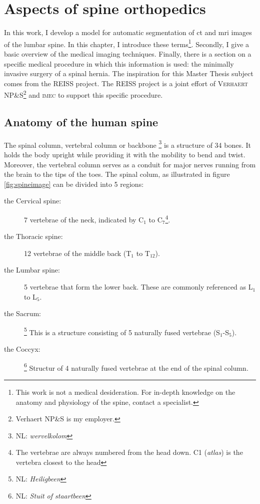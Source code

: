 \chapter{Aspects of spine orthopedics}

In this work, I develop a model for automatic segmentation of \acrfull{ct} and \acrfull{mri} images of the lumbar spine.
In this chapter, I introduce these terms\footnote{This work is not a medical desideration. For in-depth knowledge on the anatomy and physiology of the spine, contact a specialist.}.
Secondly, I give a basic overview of the medical imaging techniques. 
Finally, there is a section on a specific medical procedure in which this information is used: the minimally invasive surgery of a spinal hernia.
The inspiration for this Master Thesis subject comes from the REISS project.
The REISS project is a joint effort of \textsc{Verhaert NP\&S}\footnote{Verhaert NP\&S is my employer.} and \textsc{imec} to support this specific procedure. 

\section{Anatomy of the human spine}



The spinal column, vertebral column or backbone \footnote{NL: \textit{wervelkolom}} is a structure of 34 bones. 
It holds the body upright while providing it with the mobility to bend and twist.
Moreover, the vertebral column serves as a conduit for major nerves running from the brain to the tips of the toes.
The spinal colum, as illustrated in figure \ref{fig:spineimage} can be divided into 5 regions:
\begin{description}
    \item[the Cervical spine:] 7 vertebrae of the neck, indicated by C$_1$ to C$_7$\footnote{The vertebrae are always numbered from the head down. C1 (\textit{atlas}) is the vertebra closest to the head}.
    \item[the Thoracic spine:] 12 vertebrae of the middle back (T$_1$ to T$_{12}$).
    \item[the Lumbar spine:] 5 vertebrae that form the lower back. These are commonly referenced as L$_1$ to L$_5$.
    \item[the Sacrum:]\footnote{NL: \textit{Heiligbeen}} This is a structure consisting of 5 naturally fused vertebrae (S$_1$-S$_5$).
    \item[the Coccyx:]\footnote{NL: \textit{Stuit of staartbeen}} Structur of 4 naturally fused vertebrae at the end of the spinal column.
\end{description}

